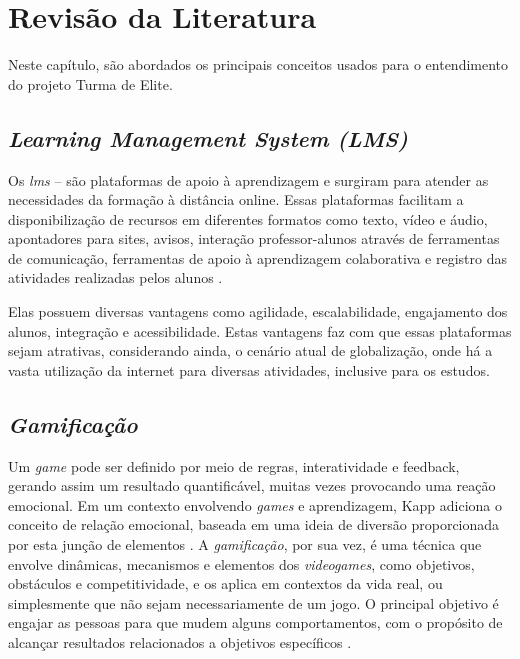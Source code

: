 \chapter{Revisão da Literatura}
Neste capítulo, são abordados os principais conceitos usados para o entendimento do projeto Turma de Elite.

\section{\textit{Learning Management System (LMS)}}
Os \textit{\ac{lms}} – são plataformas de apoio à aprendizagem e surgiram para atender as necessidades da formação à distância online. Essas plataformas facilitam a disponibilização de recursos em diferentes formatos como texto, vídeo e áudio, apontadores para sites, avisos, interação professor-alunos através de ferramentas de comunicação, ferramentas de apoio à aprendizagem colaborativa e registro das atividades realizadas pelos alunos \cite{rentabilizacao-ens-basico-e-secundario:2007}.

Elas possuem diversas vantagens como agilidade, escalabilidade, engajamento dos alunos, integração e acessibilidade. Estas vantagens faz com que essas plataformas sejam atrativas, considerando ainda, o cenário atual de globalização, onde há a vasta utilização da internet para diversas atividades, inclusive para os estudos.



\section{\textit{Gamificação}}
Um \textit{game} pode ser definido por meio de regras, interatividade e \gls{feedback}, gerando assim um resultado quantificável, muitas vezes provocando uma reação emocional. Em um contexto envolvendo \textit{games} e aprendizagem, Kapp adiciona o conceito de relação emocional, baseada em uma ideia de diversão proporcionada por esta junção de elementos \cite{gamification-of-learning:2012}.
A \textit{gamificação}, por sua vez, é uma técnica que envolve dinâmicas, mecanismos e elementos dos \textit{videogames}, como objetivos, obstáculos e competitividade, e os aplica em contextos da vida real, ou simplesmente que não sejam necessariamente de um jogo. O principal objetivo é engajar as pessoas para que mudem alguns comportamentos, com o propósito de alcançar resultados relacionados a objetivos específicos \cite{gamificação-na-ead:2014}.


